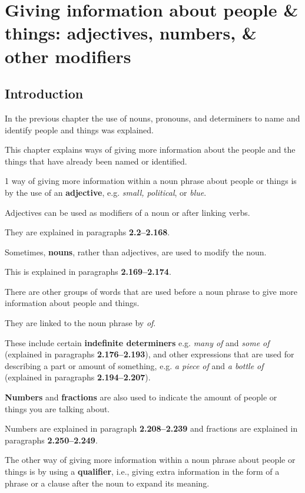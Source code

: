 \documentclass[oneside]{book}
\numberwithin{equation}{section}
\begin{document}

\chapter{Giving information about people \& things: adjectives, numbers, \& other modifiers}

\section{Introduction}
\noindent{} In the previous chapter the use of nouns, pronouns, and determiners to name and identify people and things was explained.

This chapter explains ways of giving more information about the people and the things that have already been named or identified.

%
1 way of giving more information within a noun phrase about people or things is by the use of an \textbf{adjective}, e.g. \textit{small, political}, or \textit{blue}.

Adjectives can be used as modifiers of a noun or after linking verbs.

They are explained in paragraphs \textbf{2.2--2.168}.

%
Sometimes, \textbf{nouns}, rather than adjectives, are used to modify the noun.

This is explained in paragraphs \textbf{2.169--2.174}.

%
There are other groups of words that are used before a noun phrase to give more information about people and things.

They are linked to the noun phrase by \textit{of}.

These include certain \textbf{indefinite determiners} e.g. \textit{many of} and \textit{some of} (explained in paragraphs \textbf{2.176--2.193}), and other expressions that are used for describing a part or amount of something, e.g. \textit{a piece of} and \textit{a bottle of} (explained in paragraphs \textbf{2.194--2.207}).

%
\textbf{Numbers} and \textbf{fractions} are also used to indicate the amount of people or things you are talking about.

Numbers are explained in paragraph \textbf{2.208--2.239} and fractions are explained in paragraphs \textbf{2.250--2.249}.

%
The other way of giving more information within a noun phrase about people or things is by using a \textbf{qualifier}, i.e., giving extra information in the form of a phrase or a clause after the noun to expand its meaning.
\end{document}
